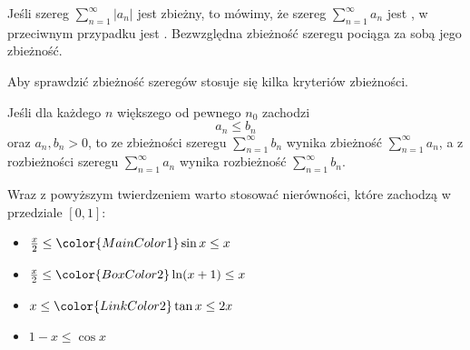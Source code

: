 Jeśli szereg $\sum_{n=1}^\infty |a_n|$ jest zbieżny, to mówimy, że szereg $\sum_{n=1}^\infty a_n$ jest , w przeciwnym przypadku jest . Bezwzględna zbieżność szeregu pociąga za sobą jego zbieżność.

Aby sprawdzić zbieżność szeregów stosuje się kilka kryteriów zbieżności.

\begin{theorem}
    Jeśli dla każdego $n$ większego od pewnego $n_0$ zachodzi
    \[ a_n \leq b_n \]
    oraz $a_n, b_n > 0$, to ze zbieżności szeregu $\sum_{n=1}^\infty b_n$ wynika zbieżność $\sum_{n=1}^\infty a_n$, a z rozbieżności szeregu $\sum_{n=1}^\infty a_n$ wynika rozbieżność $\sum_{n=1}^\infty b_n$.
\end{theorem}

\begin{remark*}
    \begin{multicols}{2}
    Wraz z powyższym twierdzeniem warto stosować nierówności, które zachodzą w przedziale $[0,1]$:
    \begin{itemize}
        \item $\frac{x}{2} \leq {\color{MainColor1} \sin{x}} \leq x$
        \item $\frac{x}{2} \leq {\color{BoxColor2} \ln(x + 1)} \leq x$
        \item $x \leq {\color{LinkColor2} \tan{x}} \leq 2x$
        \item $1 - x \leq \cos{x}$
    \end{itemize}
    \hspace{2em}

    \end{multicols}
\end{remark*}

